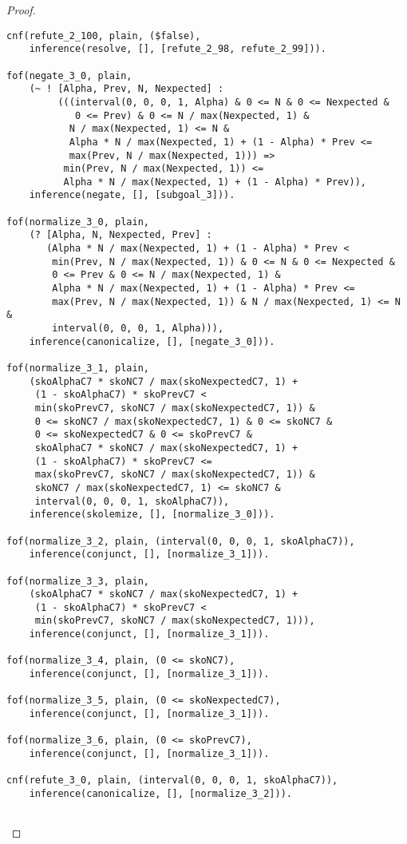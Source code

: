 \begin{proof}
\begin{verbatim}
cnf(refute_2_100, plain, ($false),
    inference(resolve, [], [refute_2_98, refute_2_99])).

fof(negate_3_0, plain,
    (~ ! [Alpha, Prev, N, Nexpected] :
         (((interval(0, 0, 0, 1, Alpha) & 0 <= N & 0 <= Nexpected &
            0 <= Prev) & 0 <= N / max(Nexpected, 1) &
           N / max(Nexpected, 1) <= N &
           Alpha * N / max(Nexpected, 1) + (1 - Alpha) * Prev <=
           max(Prev, N / max(Nexpected, 1))) =>
          min(Prev, N / max(Nexpected, 1)) <=
          Alpha * N / max(Nexpected, 1) + (1 - Alpha) * Prev)),
    inference(negate, [], [subgoal_3])).

fof(normalize_3_0, plain,
    (? [Alpha, N, Nexpected, Prev] :
       (Alpha * N / max(Nexpected, 1) + (1 - Alpha) * Prev <
        min(Prev, N / max(Nexpected, 1)) & 0 <= N & 0 <= Nexpected &
        0 <= Prev & 0 <= N / max(Nexpected, 1) &
        Alpha * N / max(Nexpected, 1) + (1 - Alpha) * Prev <=
        max(Prev, N / max(Nexpected, 1)) & N / max(Nexpected, 1) <= N &
        interval(0, 0, 0, 1, Alpha))),
    inference(canonicalize, [], [negate_3_0])).

fof(normalize_3_1, plain,
    (skoAlphaC7 * skoNC7 / max(skoNexpectedC7, 1) +
     (1 - skoAlphaC7) * skoPrevC7 <
     min(skoPrevC7, skoNC7 / max(skoNexpectedC7, 1)) &
     0 <= skoNC7 / max(skoNexpectedC7, 1) & 0 <= skoNC7 &
     0 <= skoNexpectedC7 & 0 <= skoPrevC7 &
     skoAlphaC7 * skoNC7 / max(skoNexpectedC7, 1) +
     (1 - skoAlphaC7) * skoPrevC7 <=
     max(skoPrevC7, skoNC7 / max(skoNexpectedC7, 1)) &
     skoNC7 / max(skoNexpectedC7, 1) <= skoNC7 &
     interval(0, 0, 0, 1, skoAlphaC7)),
    inference(skolemize, [], [normalize_3_0])).

fof(normalize_3_2, plain, (interval(0, 0, 0, 1, skoAlphaC7)),
    inference(conjunct, [], [normalize_3_1])).

fof(normalize_3_3, plain,
    (skoAlphaC7 * skoNC7 / max(skoNexpectedC7, 1) +
     (1 - skoAlphaC7) * skoPrevC7 <
     min(skoPrevC7, skoNC7 / max(skoNexpectedC7, 1))),
    inference(conjunct, [], [normalize_3_1])).

fof(normalize_3_4, plain, (0 <= skoNC7),
    inference(conjunct, [], [normalize_3_1])).

fof(normalize_3_5, plain, (0 <= skoNexpectedC7),
    inference(conjunct, [], [normalize_3_1])).

fof(normalize_3_6, plain, (0 <= skoPrevC7),
    inference(conjunct, [], [normalize_3_1])).

cnf(refute_3_0, plain, (interval(0, 0, 0, 1, skoAlphaC7)),
    inference(canonicalize, [], [normalize_3_2])).


\end{verbatim}
\end{proof}
